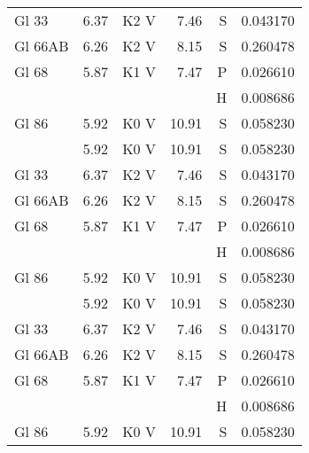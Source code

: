 \documentclass{aa}
\begin{document}
{\begin{longtable}{lllrrr}
Gl 33    & 6.37 & K2 V & 7.46 & S & 0.043170\\
Gl 66AB  & 6.26 & K2 V & 8.15 & S & 0.260478\\
Gl 68    & 5.87 & K1 V & 7.47 & P & 0.026610\\
         &      &      &      & H & 0.008686\\
Gl 86    & 5.92 & K0 V & 10.91& S & 0.058230\\            & 5.92 & K0 V & 10.91& S & 0.058230\\
Gl 33    & 6.37 & K2 V & 7.46 & S & 0.043170\\
Gl 66AB  & 6.26 & K2 V & 8.15 & S & 0.260478\\
Gl 68    & 5.87 & K1 V & 7.47 & P & 0.026610\\
         &      &      &      & H & 0.008686\\
Gl 86    & 5.92 & K0 V & 10.91& S & 0.058230\\            & 5.92 & K0 V & 10.91& S & 0.058230\\
Gl 33    & 6.37 & K2 V & 7.46 & S & 0.043170\\
Gl 66AB  & 6.26 & K2 V & 8.15 & S & 0.260478\\
Gl 68    & 5.87 & K1 V & 7.47 & P & 0.026610\\
         &      &      &      & H & 0.008686\\
Gl 86    & 5.92 & K0 V & 10.91& S & 0.058230\\   
\end{longtable}
}
\end{document}
